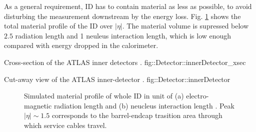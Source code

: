 
%
As a general requirement, ID has to contain material as less as possible, to avoid disturbing the measurement downstream by the energy loss. 
Fig. \ref{fig::Detector::IDmaterial} shows the total material profile of the ID over $|\eta|$. 
The material volume is supressed below $2.5$ radiation length and 1 neuleus interaction length, which is low enough compared with energy dropped in the calorimeter.


{Cross-section of the ATLAS inner detectors \cite{ATLAS_exp}.}
{fig::Detector::innerDetector_xsec}


{Cut-away view of the ATLAS inner-detector \cite{ATLAS_exp}.}
{fig::Detector::innerDetector}

\begin{figure}[h]
  \centering
    \caption{ Simulated material profile of whole ID in unit of (a) electro-magnetic radiation length and (b) neucleus interaction length \cite{ATLAS_exp}.
      Peak $|\eta|\sim 1.5$ corresponds to the barrel-endcap trasition area through which service cables travel.
      \label{fig::Detector::IDmaterial} }
\end{figure}



